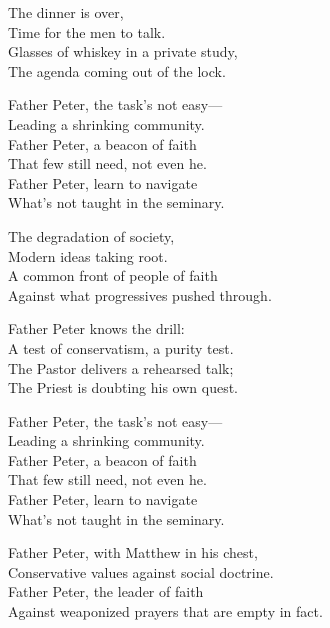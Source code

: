 \begin{lyrics}
The dinner is over,\\
Time for the men to talk.\\
Glasses of whiskey in a private study,\\
The agenda coming out of the lock.

Father Peter, the task's not easy—\\
Leading a shrinking community.\\
Father Peter, a beacon of faith\\
That few still need, not even he.\\
Father Peter, learn to navigate\\
What's not taught in the seminary.

The degradation of society,\\
Modern ideas taking root.\\
A common front of people of faith\\
Against what progressives pushed through.

Father Peter knows the drill:\\
A test of conservatism, a purity test.\\
The Pastor delivers a rehearsed talk;\\
The Priest is doubting his own quest.

Father Peter, the task's not easy—\\
Leading a shrinking community.\\
Father Peter, a beacon of faith\\
That few still need, not even he.\\
Father Peter, learn to navigate\\
What's not taught in the seminary.

Father Peter, with Matthew in his chest,\\
Conservative values against social doctrine.\\
Father Peter, the leader of faith\\
Against weaponized prayers that are empty in fact.
\end{lyrics}

